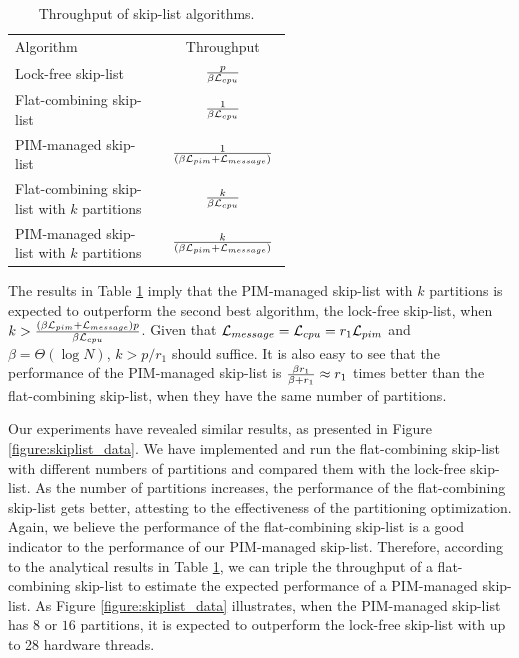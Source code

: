 \begin{table}[ht!]
\begin{center}
    \begin{tabular}{| m{0.55\linewidth}  | c |}
    \hline
    Algorithm & Throughput \\ \hhline{|=|=|} 
    Lock-free skip-list & ${p \over \beta\mathcal{L}_{cpu}}$ \\ \hline
    Flat-combining skip-list & ${1 \over \beta\mathcal{L}_{cpu}}$ \\ \hline
    PIM-managed skip-list & ${1 \over (\beta\mathcal{L}_{pim} + \mathcal{L}_{message})}$ \\ \hline
    Flat-combining skip-list with $k$ partitions & ${k \over \beta\mathcal{L}_{cpu}}$ \\ \hline
    PIM-managed skip-list with $k$ partitions & ${k \over (\beta\mathcal{L}_{pim} + \mathcal{L}_{message})}$ \\ \hline
    \end{tabular}
\end{center}
\caption{Throughput of skip-list algorithms.}
\label{tab:skiplist}
\end{table}

The results in Table \ref{tab:skiplist} imply that 
the PIM-managed skip-list with $k$ partitions is expected to outperform the second best algorithm, 
the lock-free skip-list, when $k > {(\beta\mathcal{L}_{pim} + \mathcal{L}_{message})p \over \beta\mathcal{L}_{cpu}}$.
Given that $\mathcal{L}_{message} = \mathcal{L}_{cpu} = r_1\mathcal{L}_{pim}$ and $\beta = \Theta(\log N)$, $k > p/r_1$ should suffice.
It is also easy to see that the performance of the PIM-managed skip-list is  
${\beta r_1 \over \beta + r_1} \approx r_1$ times better than the flat-combining skip-list, 
when they have the same number of partitions. 

Our experiments have revealed similar results, 
as presented in Figure \ref{figure:skiplist_data}.
We have implemented and run the flat-combining skip-list with different numbers of
partitions and compared them with the lock-free skip-list.
As the number of partitions increases, the performance of the flat-combining skip-list
gets better, attesting to the effectiveness of the partitioning optimization.
Again, we believe the performance of the flat-combining skip-list is a good indicator
to the performance of our PIM-managed skip-list.
Therefore, according to the analytical results in Table \ref{tab:skiplist}, we can triple the throughput 
of a flat-combining skip-list to estimate the expected performance of a PIM-managed skip-list.
As Figure \ref{figure:skiplist_data} illustrates, when the PIM-managed skip-list has $8$ or $16$ 
partitions, it is expected to outperform the lock-free skip-list with up to 28 hardware threads.


